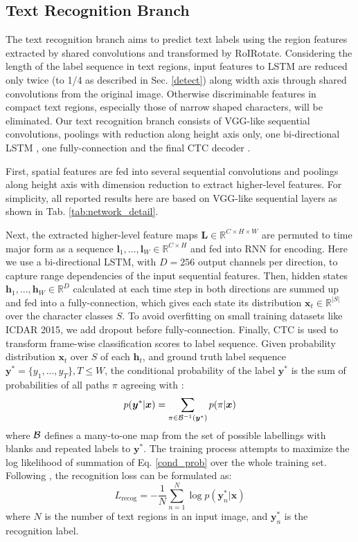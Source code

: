\documentclass[10pt,twocolumn,letterpaper]{article}
\begin{document}
\subsection{Text Recognition Branch}
\label{recog}
The text recognition branch aims to predict text labels using the region features extracted by shared convolutions and transformed by RoIRotate. Considering the length of the label sequence in text regions, input features to LSTM are reduced only twice (to 1/4 as described in Sec. \ref{detect}) along width axis through shared convolutions from the original image. Otherwise discriminable features in compact text regions, especially those of narrow shaped characters, will be eliminated. Our text recognition branch consists of VGG-like \cite{simonyan2014vgg} sequential convolutions, poolings with reduction along height axis only, one bi-directional LSTM \cite{schuster1997bidirectional,hochreiter1997lstm}, one fully-connection and the final CTC decoder \cite{graves2006ctc}.

First, spatial features are fed into several sequential convolutions and poolings along height axis with dimension reduction to extract higher-level features. For simplicity, all reported results here are based on VGG-like sequential layers as shown in Tab. \ref{tab:network_detail}.

Next, the extracted higher-level feature maps $\mathbf{L} \in \mathbb{R}^{C \times H \times W}$ are permuted to time major form as a sequence $ \bm{l}_1, ..., \bm{l}_W \in \mathbb{R}^{C \times H}$ and fed into RNN for encoding. Here we use a bi-directional LSTM, with $D=256$ output channels per direction, to capture range dependencies of the input sequential features. Then, hidden states $\bm{h}_1, ..., \bm{h}_W \in \mathbb{R}^{D}$ calculated at each time step in both directions are summed up and fed into a fully-connection, which gives each state its distribution $\bm{x}_t \in \mathbb{R}^{\vert S \vert}$ over the character classes $S$. To avoid overfitting on small training datasets like ICDAR 2015, we add dropout before fully-connection. Finally, CTC is used to transform frame-wise classification scores to label sequence. Given probability distribution $\bm{x}_t$ over $S$ of each $\bm{h}_t $, and ground truth label sequence $\bm{y}^* = \{y_1, ..., y_T \}, T \leqslant W$, the conditional probability of the label $\bm{y}^*$ is the sum of probabilities of all paths $\pi$ agreeing with \cite{graves2006ctc}:
\begin{equation}
p(\bm{y}^* \vert \bm{x}) = \sum_{\pi \in {\cal B}^{-1}(\bm{y}^*)} p(\pi \vert \bm{x}) \label{cond_prob}
\end{equation}
where ${\cal B}$ defines a many-to-one map from the set of possible labellings with blanks and repeated labels to $\bm{y}^*$. The training process attempts to maximize the log likelihood of summation of Eq. \eqref{cond_prob} over the whole training set. Following \cite{graves2006ctc}, the recognition loss can be formulated as:
\begin{equation}
L_{\text{recog}} = -\frac{1}{N} \sum_{n=1}^{N} \log p(\bm{y}_n^* \vert \bm{x})
\end{equation}
where $N$ is the number of text regions in an input image, and $\bm{y}_n^*$ is the recognition label.
\end{document}

